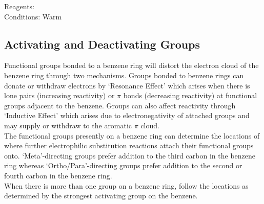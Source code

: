 \documentclass[../main]{subfiles}
\begin{document}
	Reagents:  \\
	Conditions: Warm \\

	\subsection{Activating and Deactivating Groups}

	Functional groups bonded to a benzene ring will distort the electron cloud of the benzene ring through two mechanisms. 
	Groups bonded to benzene rings can donate or withdraw electrons by `Resonance Effect' which arises when there is lone pairs (increasing reactivity) or \(\pi\) bonds (decreasing reactivity) at functional groups adjacent to the benzene. Groups can also affect reactivity through `Inductive Effect' which arises due to electronegativity of attached groups and may supply or withdraw  to the aromatic \(\pi\)  cloud. \\

	The functional groups presently on a benzene ring can determine the locations of where further electrophilic substitution reactions attach their functional groups onto. `Meta'-directing groups prefer addition to the third carbon in the benzene ring whereas `Ortho/Para'-directing groups prefer addition to the second or fourth carbon in the benzene ring. \\

	When there is more than one group on a benzene ring, follow the locations as determined by the strongest activating group on the benzene.
	
\end{document}
